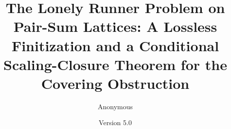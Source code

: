 \documentclass[11pt,a4paper]{article}
\numberwithin{equation}{section}
\theoremstyle{plain}
\theoremstyle{definition}
\theoremstyle{remark}
\newcommand{\papertitle}{The Lonely Runner Problem on Pair-Sum Lattices: A Lossless
Finitization and a Conditional Scaling-Closure Theorem for the
Covering Obstruction}
\begin{document}
\title{\papertitle}
\author{Anonymous}
\date{Version 5.0}
\maketitle

\tableofcontents
\clearpage















\end{document}
